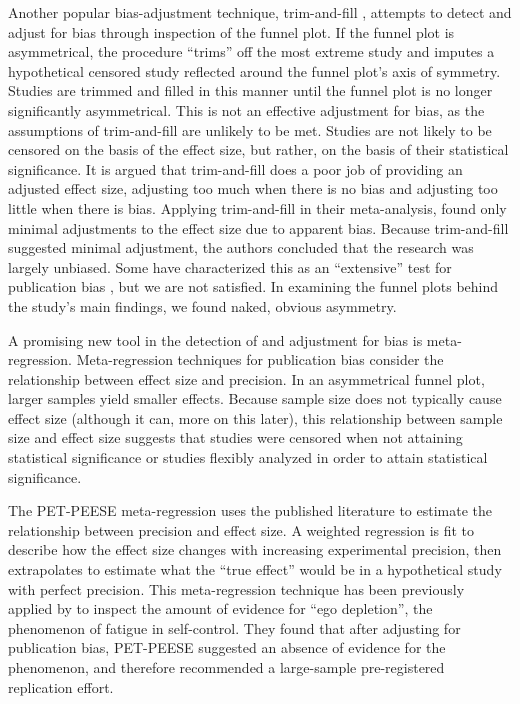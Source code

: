 \documentclass[man]{apa6}
\begin{document}
Another popular bias-adjustment technique, trim-and-fill \citep{Duval:Tweedie:2000}, attempts to detect and adjust for bias through inspection of the funnel plot. If the funnel plot is asymmetrical, the procedure ``trims'' off the most extreme study and imputes a hypothetical censored study reflected around the funnel plot's axis of symmetry. Studies are trimmed and filled in this manner until the funnel plot is no longer significantly asymmetrical. This is not an effective adjustment for bias, as the assumptions of trim-and-fill are unlikely to be met. Studies are not likely to be censored on the basis of the effect size, but rather, on the basis of their statistical significance. It is argued that trim-and-fill does a poor job of providing an adjusted effect size, adjusting too much when there is no bias and adjusting too little when there is bias. %
Applying trim-and-fill in their meta-analysis, \citet{Anderson:etal:2014} found only minimal adjustments to the effect size due to apparent bias. Because trim-and-fill suggested minimal adjustment, the authors concluded that the research was largely unbiased. %
Some have characterized this as an ``extensive'' test for publication bias \citep{some-chucklehead}, but we are not satisfied. In examining the funnel plots behind the study's main findings, we found naked, obvious asymmetry. %

A promising new tool in the detection of and adjustment for bias is meta-regression. Meta-regression techniques for publication bias consider the relationship between effect size and precision. In an asymmetrical funnel plot, larger samples yield smaller effects. Because sample size does not typically cause effect size (although it can, more on this later), this relationship between sample size and effect size suggests that studies were censored when not attaining statistical significance or studies flexibly analyzed in order to attain statistical significance. 

The PET-PEESE meta-regression \citep{Stanley:Doucouliagos:2013} %
uses the published literature to estimate the relationship between precision and effect size. A weighted regression is fit to describe how the effect size changes with increasing experimental precision, then extrapolates to estimate what the ``true effect'' would be in a hypothetical study with perfect precision. This meta-regression technique has been previously applied by \citet{Carter:McCullough:2014} to inspect the amount of evidence for ``ego depletion'', the phenomenon of fatigue in self-control. They found that after adjusting for publication bias, PET-PEESE suggested an absence of evidence for the phenomenon, and therefore recommended a large-sample pre-registered replication effort.
\end{document}
